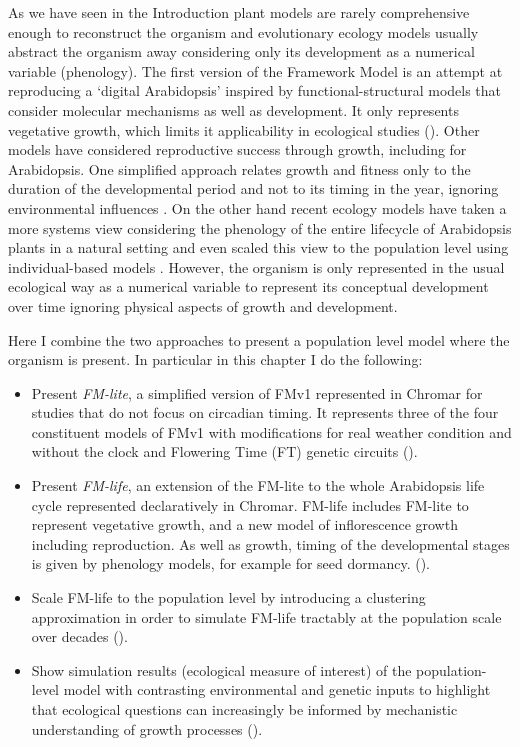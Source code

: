 As we have seen in the Introduction plant models are rarely comprehensive enough
to reconstruct the organism and evolutionary ecology models usually abstract the
organism away considering only its development as a numerical variable
(phenology). The first version of the Framework Model
\citep[FMv1;][]{chew_multiscale_2014} is an attempt at reproducing a `digital
Arabidopsis' inspired by functional-structural models that consider molecular
mechanisms as well as development. It only represents vegetative growth, which
limits it applicability in ecological studies (). Other models
have considered reproductive success through growth, including for
Arabidopsis. One simplified approach relates growth and fitness only to the
duration of the developmental period and not to its timing in the year, ignoring
environmental influences \citep{prusinkiewicz_evolution_2007}. On the other hand
recent ecology models have taken a more systems view considering the phenology
of the entire lifecycle of Arabidopsis plants in a natural setting and even
scaled this view to the population level using individual-based models
\citep{burghardt_modeling_2015}. However, the organism is only represented in
the usual ecological way as a numerical variable to represent its conceptual
development over time ignoring physical aspects of growth and development.

Here I combine the two approaches to present a population level model where the
organism is present. In particular in this chapter I do the following:
\begin{itemize}
\item Present \emph{FM-lite}, a simplified version of FMv1
  \citep{chew_multiscale_2014} represented in Chromar for studies that do not
    focus on circadian timing. It represents three of the four constituent
    models of FMv1 with modifications for real weather condition and without the
    clock and Flowering Time (FT) genetic circuits ().
  \item Present \emph{FM-life}, an extension of the FM-lite to the whole
    Arabidopsis life cycle represented declaratively in Chromar. FM-life
    includes FM-lite to represent vegetative growth, and a new model of
    inflorescence growth including reproduction. As well as growth, timing of
    the developmental stages is given by phenology models, for example for seed
    dormancy. ().
\item Scale FM-life to the population level by introducing a clustering
  approximation in order to simulate FM-life tractably at the population scale
  over decades ().
\item Show simulation results (ecological measure of interest) of the
  population-level model with contrasting environmental and genetic inputs to
  highlight that ecological questions can increasingly be informed by mechanistic
  understanding of growth processes \citep{millar_intracellular_2016,
    doebeli_towards_2017} ().
\end{itemize}


